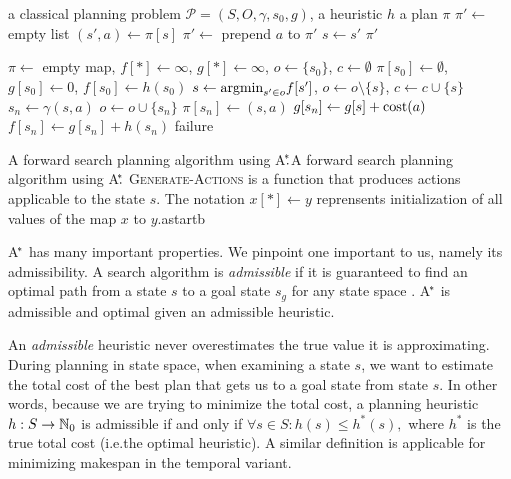 %
{%
\Input a classical planning problem $\mathcal{P} = (S, O, \gamma, s_0, g)$,
a heuristic $h$
\Output a plan $\pi$
\State $\pi' \gets $ empty list
	\State $(s', a) \gets \pi[s]$
	\State $\pi' \gets$ prepend $a$ to $\pi'$
	\State $s \gets s'$
\EndWhile
\State \Return $\pi'$
\EndFunction

\State $\pi \gets $ empty map, $f[*] \gets \infty$, $g[*] \gets \infty$, $o \gets \{s_0\}$, $c \gets \emptyset$
\State $\pi[s_0] \gets \emptyset$,
$g[s_0] \gets 0$, $f[s_0] \gets h(s_0)$
\State $s \gets \textrm{argmin}_{s' \in o} f[s']$, $o \gets o \setminus \{s\}$, $c \gets c \cup \{s\}$
 \Return {} \EndIf
{}
	\State $s_n \gets \gamma(s, a)$ 
	 
		 $o \gets o \cup \{s_n\}$  \EndIf
		 
			\State $\pi[s_n] \gets (s, a)$
			\State $g[s_n] \gets g[s] + \textrm{cost}(a)$
			\State $f[s_n] \gets g[s_n] + h(s_n)$
		\EndIf
	\EndIf
\EndFor
\EndWhile
\Return failure
\EndFunction
}%
{A forward search planning algorithm using A$^{\kern-.15em*}{\kern-.30em.}$}{A forward search planning algorithm using A$^{\kern-.15em*}{\kern-.30em.}$
\textsc{Generate-Actions} is a function that produces actions applicable to the state $s$. The notation $x[*] \gets y$  reprensents initialization of all values of the map $x$ to $y$.}{astar}{tb}

A$^{\kern-.15em*}$ has many important properties. We pinpoint one important to us, namely its admissibility.
A search algorithm is \textit{admissible}
if it is guaranteed to find an optimal path from a state $s$
to a goal state $s_g$ for any state space \citep{Hart1968}.
A$^{\kern-.15em*}$ is admissible and optimal given an admissible heuristic.

An \textit{admissible} heuristic never overestimates
the true value it is approximating. During planning in state space,
when examining a state $s$, we want to estimate the total cost of the best
plan that gets us to a goal state from state $s$. In other words, because we are
trying to minimize the total cost,
a planning heuristic $h: S \to \mathbb{N}_0$ is admissible if and only if $\forall s \in S : h(s) \leq h^*(s),$
where $h^*$ is the true total cost (i.e.\;the optimal heuristic). A similar definition is applicable for minimizing makespan in the temporal variant.

